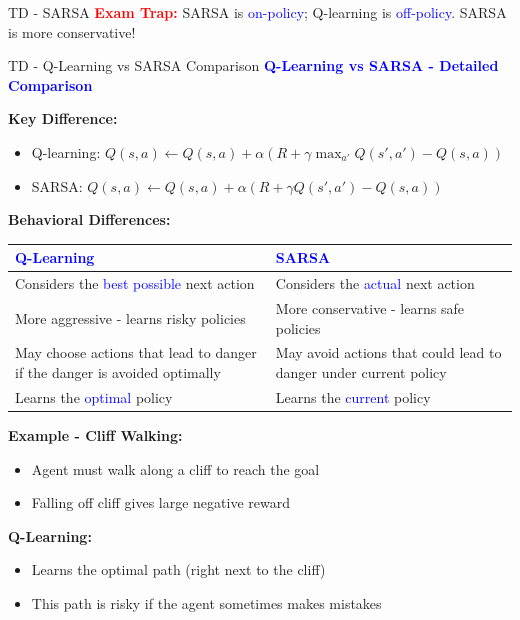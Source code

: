 \documentclass[8pt]{beamer}
\begin{document}
\begin{frame}{TD - SARSA}
		\textcolor{red}{\textbf{Exam Trap:}} SARSA is \textcolor{blue}{on-policy}; Q-learning is \textcolor{blue}{off-policy}. SARSA is more conservative!
	\end{frame}
	
	\begin{frame}{TD - Q-Learning vs SARSA Comparison}
		\fontsize{6.5}{7.5}\selectfont
		\textcolor{blue}{\textbf{Q-Learning vs SARSA - Detailed Comparison}}
		
		\textbf{Key Difference:}
		\begin{itemize}
			\item Q-learning: $Q(s,a) \leftarrow Q(s,a) + \alpha(R + \gamma \max_{a'} Q(s',a') - Q(s,a))$
			\item SARSA: $Q(s,a) \leftarrow Q(s,a) + \alpha(R + \gamma Q(s',a') - Q(s,a))$
		\end{itemize}
		
		\textbf{Behavioral Differences:}
		
		\begin{tabular}{|p{4.5cm}|p{4.5cm}|}
			\hline
			\textcolor{blue}{Q-Learning} & \textcolor{blue}{SARSA} \\
			\hline
			Considers the \textcolor{blue}{best possible} next action & Considers the \textcolor{blue}{actual} next action \\
			\hline
			More aggressive - learns risky policies & More conservative - learns safe policies \\
			\hline
			May choose actions that lead to danger if the danger is avoided optimally & May avoid actions that could lead to danger under current policy \\
			\hline
			Learns the \textcolor{blue}{optimal} policy & Learns the \textcolor{blue}{current} policy \\
			\hline
		\end{tabular}
		
		\textbf{Example - Cliff Walking:}
		\begin{itemize}
			\item Agent must walk along a cliff to reach the goal
			\item Falling off cliff gives large negative reward
		\end{itemize}
		
		\textbf{Q-Learning:}
		\begin{itemize}
			\item Learns the optimal path (right next to the cliff)
			\item This path is risky if the agent sometimes makes mistakes
		\end{itemize}
		

\end{frame}
\end{document}
